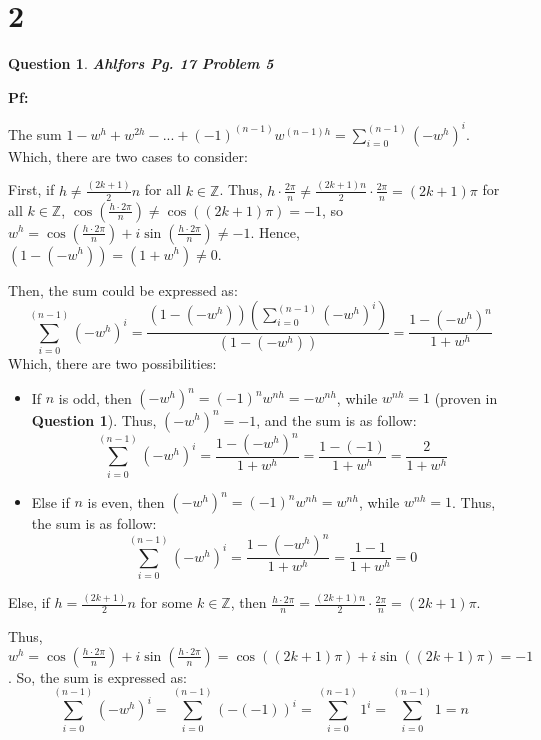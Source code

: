 \documentclass{article}
\newtheorem{question}{Question}
\begin{document}
\break

\section*{2}
\begin{question}
    \textbf{Ahlfors Pg. 17 Problem 5
    }
\end{question}

\textbf{Pf:}

The sum $1-w^h+w^{2h}-...+(-1)^{(n-1)}w^{(n-1)h} = \sum_{i=0}^{(n-1)}(-w^h)^{i}$. Which, there are two cases to consider:

\hfill

First, if $h\neq \frac{(2k+1)}{2}n$ for all $k\in\mathbb{Z}$. Thus, $h\cdot\frac{2\pi}{n}\neq\frac{(2k+1)n}{2}\cdot\frac{2\pi}{n} = (2k+1)\pi$ for all $k\in\mathbb{Z}$, $\cos\left(\frac{h\cdot 2\pi}{n}\right) \neq \cos((2k+1)\pi)= -1$, so $w^h=\cos\left(\frac{h\cdot 2\pi}{n}\right)+i\sin\left(\frac{h\cdot 2\pi}{n}\right) \neq -1$. Hence, $(1-(-w^h)) = (1+w^h) \neq 0$.

Then, the sum could be expressed as:
$$\sum_{i=0}^{(n-1)}(-w^h)^{i} = \frac{(1-(-w^h))(\sum_{i=0}^{(n-1)}(-w^h)^{i})}{(1-(-w^h))} = \frac{1-(-w^h)^n}{1+w^h}$$
Which, there are two possibilities:

\begin{itemize}
    \item If $n$ is odd, then $(-w^h)^n = (-1)^nw^{nh} = -w^{nh}$, while $w^{nh}=1$ (proven in \textbf{Question 1}). Thus, $(-w^h)^n = -1$, and the sum is as follow:
    $$\sum_{i=0}^{(n-1)}(-w^h)^{i}=\frac{1-(-w^h)^n}{1+w^h} = \frac{1-(-1)}{1+w^h} = \frac{2}{1+w^h}$$

    \item Else if $n$ is even, then $(-w^h)^n = (-1)^nw^{nh} = w^{nh}$, while $w^{nh}=1$. Thus, the sum is as follow:
    $$\sum_{i=0}^{(n-1)}(-w^h)^{i}=\frac{1-(-w^h)^n}{1+w^h} = \frac{1-1}{1+w^h}=0$$
\end{itemize}

\hfill

Else, if $h=\frac{(2k+1)}{2}n$ for some $k\in\mathbb{Z}$, then $\frac{h\cdot 2\pi}{n} = \frac{(2k+1)n}{2}\cdot\frac{2\pi}{n} = (2k+1)\pi$. 

Thus, $w^h = \cos\left(\frac{h\cdot 2\pi}{n}\right)+i\sin\left(\frac{h\cdot 2\pi}{n}\right) = \cos((2k+1)\pi)+i\sin((2k+1)\pi) = -1$. So, the sum is expressed as:
$$\sum_{i=0}^{(n-1)}(-w^h)^{i} = \sum_{i=0}^{(n-1)}(-(-1))^{i}=\sum_{i=0}^{(n-1)}1^{i} = \sum_{i=0}^{(n-1)}1 = n$$
\end{document}
